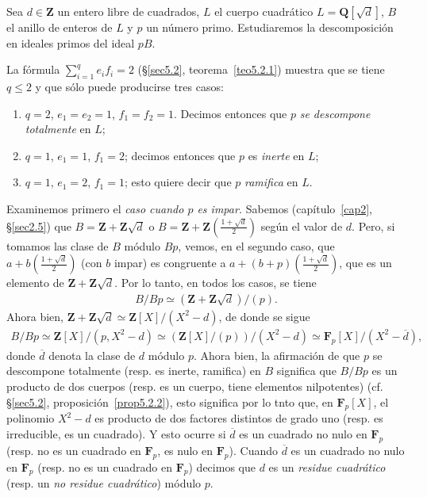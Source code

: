 \documentclass[10pt,oneside,bibtotoc,smallheadings,leqno,a5paper,DIV=12]{scrbook}
\newcommand{\QQ}{\mathbf{Q}}
\newcommand{\ZZ}{\mathbf{Z}}
\newcommand{\FF}{\mathbf{F}}
\newcommand{\oline}[1]{\overline{#1}}
\numberwithin{equation}{section}
\theoremstyle{defi}
\theoremstyle{enonce}
\theoremstyle{rem}
\numberwithin{theorem}{section}
\numberwithin{proposition}{section}
\numberwithin{definition}{section}
\numberwithin{lemma}{section}
\numberwithin{corollary}{section}
\numberwithin{example}{section}
\numberwithin{footnote}{section}%
\begin{document}
Sea $d\in\ZZ$ un entero libre de cuadrados, $L$ el cuerpo cuadr\'atico $L = \QQ[\sqrt{d}]$,
$B$ el anillo de enteros de $L$ y $p$ un n\'umero primo. Estudiaremos la descomposici\'on en ideales
primos del ideal $pB$.

La f\'ormula $\sum_{i=1}^{q}e_{i}f_{i}=2$ (\S\ref{sec5.2}, teorema~\ref{teo5.2.1}) muestra que se tiene $q\leq 2$ y que
s\'olo puede producirse tres casos:
\begin{enumerate}
\item $q=2$, $e_{1}=e_{2}=1$, $f_{1}=f_{2}=1$. Decimos entonces que $p$ {\em se descompone totalmente}
en $L$;
\item $q=1$, $e_{1}=1$, $f_{1}=2$; decimos entonces que $p$ es {\em inerte} en $L$;
\item $q=1$, $e_{1}=2$, $f_{1}=1$; esto quiere decir que $p$ {\em ramifica} en $L$.
\end{enumerate}
Examinemos primero el {\em caso cuando $p$ es impar.} Sabemos (cap\'itulo~\ref{cap2}, \S\ref{sec2.5}) que
$B = \ZZ+\ZZ\sqrt{d}$ o $B = \ZZ+\ZZ\left(\frac{1+\sqrt{d}}{2}\right)$ seg\'un el valor de $d$. Pero,
si tomamos las clase de $B$ m\'odulo $Bp$, vemos, en el segundo caso, que $a+b\left(\frac{1+\sqrt{d}}{2}\right)$
(con $b$ impar) es congruente a $a+(b+p)\left(\frac{1+\sqrt{d}}{2}\right)$, que es un elemento de
$\ZZ+\ZZ\sqrt{d}$. Por lo tanto, en todos los casos, se tiene
\begin{gather*}
B/Bp\simeq(\ZZ+\ZZ\sqrt{d})/(p).
\end{gather*}
Ahora bien, $\ZZ+\ZZ\sqrt{d}\simeq\ZZ[X]/(X^{2}-d)$, de donde se sigue
\begin{gather*}
B/Bp\simeq\ZZ[X]/(p,X^{2}-d)\simeq(\ZZ[X]/(p))/(X^{2}-d)\simeq\FF_{p}[X]/(X^{2}-\oline d),
\end{gather*}
donde $\oline d$ denota la clase de $d$ m\'odulo $p$. Ahora bien, la afirmaci\'on de que $p$ se
descompone totalmente (resp. es inerte, ramifica) en $B$ significa que $B/Bp$ es un producto de dos cuerpos
(resp. es un cuerpo, tiene elementos nilpotentes) (cf. \S\ref{sec5.2}, proposici\'on~\ref{prop5.2.2}), esto significa por lo tnto que,
en $\FF_{p}[X]$, el polinomio $X^{2}-d$ es producto de dos factores distintos de grado uno (resp.
es irreducible, es un cuadrado). Y esto ocurre si $\oline d$ es un cuadrado no nulo en $\FF_{p}$
(resp. no es un cuadrado en $\FF_{p}$, es nulo en $\FF_{p}$). Cuando $\oline d$ es un cuadrado no nulo
en $\FF_{p}$ (resp. no es un cuadrado en $\FF_{p}$) decimos que $d$ es un {\em residue cuadr\'atico}
(resp. un {\em no residue cuadr\'atico}) m\'odulo $p$.
\end{document}
